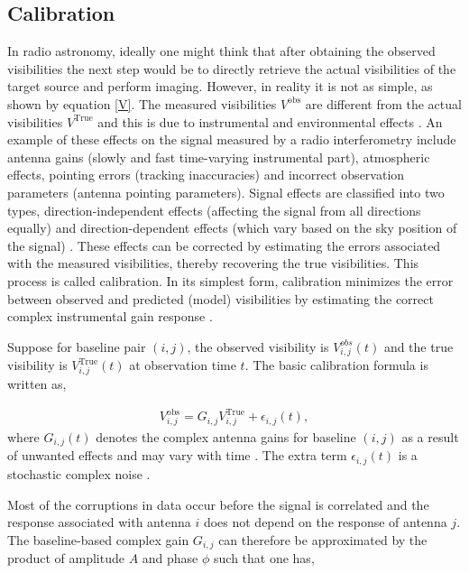 \subsection{Calibration}
\label{Calib}
In radio astronomy, ideally one might think that after obtaining the observed visibilities the next step would be to directly retrieve the actual visibilities of the target source and perform imaging. However, in reality it is not as simple, as shown by equation \ref{V}. The measured visibilities $V^{\mathrm{obs}}$ are different from the actual visibilities $V^{\mathrm{True}}$ and this is due to instrumental and environmental effects \citep{thompson2017interferometry}. An example of these effects on the signal measured by a radio interferometry include antenna gains (slowly and fast time-varying instrumental part), atmospheric effects, pointing errors (tracking inaccuracies) and incorrect observation parameters (antenna pointing parameters). Signal effects are classified into two types, direction-independent effects (affecting the signal from all directions equally) and direction-dependent effects (which vary based on the sky position of the signal) \citep{taylor1999synthesis}. These effects can be corrected by estimating the errors associated with the measured visibilities, thereby recovering the true visibilities. This process is called calibration. In its simplest form, calibration minimizes the error between observed and predicted (model) visibilities by estimating the correct complex instrumental gain response \citep{grobler2016calibration}. 

Suppose for baseline pair $(i,j)$, the observed visibility is $V^{obs}_{i,j}(t)$ and the true visibility is $V^{\mathrm{True}}_{i,j}(t)$ at observation time $t$. The basic calibration formula is written as,

\begin{align}
V_{i,j}^{\mathrm{obs}}=G_{i,j} V_{i,j}^{\mathrm{True}} + \epsilon_{i,j}(t) ,
\end{align}
where $G_{i,j}(t)$ denotes the complex antenna gains for baseline $(i,j)$ as a result of unwanted effects and may vary with time \citep{thompson2001interferometry}. The extra term $ \epsilon_{i,j}(t)$ is a stochastic complex noise \citep{taylor1999synthesis}.

Most of the corruptions in data occur before the signal is correlated and the response associated with antenna  $i$  does not depend on the response of antenna $j$. The baseline-based complex gain $G_{i,j}$ can therefore be approximated by the product of amplitude $A$ and phase $\phi$ such that one has,  

